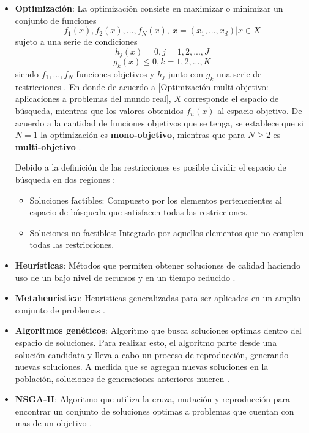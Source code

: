\documentclass[11pt,letterpaper]{article}
\begin{document}
\begin{itemize}
\item \textbf{Optimización}: La optimización consiste en maximizar o minimizar un conjunto de funciones
$$f_1(x),f_2(x), ..., f_N(x),\ x=(x_1,...,x_d) | x \in X$$
sujeto a una serie de condiciones
$$h_j(x) = 0, j=1,2,...,J$$
$$g_k(x) \leq 0, k=1,2,...,K$$
siendo $f_1,...,f_N$ funciones objetivos y   $h_j$ junto con $g_k$ una serie de restricciones \cite{Yang2015}. En donde de acuerdo a [Optimización multi-objetivo: aplicaciones a problemas del mundo real], $X$ corresponde el espacio de búsqueda, mientras que los valores obtenidos $f_n(x)$ al espacio objetivo. De acuerdo a la cantidad de funciones objetivos que se tenga, se establece que si $N=1$ la optimización es \textbf{mono-objetivo}, mientras que para $N\geq 2$ es \textbf{multi-objetivo} \cite{Yang2015}.

Debido a la definición de las restricciones es posible dividir el espacio de búsqueda en dos regiones \cite{Lopez2013}:
\begin{itemize}
	\item Soluciones factibles: Compuesto por los elementos pertenecientes al espacio de búsqueda que satisfacen todas las restricciones.
	\item Soluciones no factibles: Integrado por aquellos elementos que no complen todas las restricciones.
\end{itemize}
\item \textbf{Heurísticas}: Métodos que permiten obtener soluciones de calidad haciendo uso de un bajo nivel de recursos y en un tiempo reducido \cite{Lopez2013}.
\item \textbf{Metaheuristica}: Heuristicas generalizadas para ser aplicadas en un amplio conjunto de problemas \cite{Lopez2013}.
\item \textbf{Algoritmos genéticos}: Algoritmo que busca soluciones optimas dentro del espacio de soluciones. Para realizar esto, el algoritmo parte desde una solución candidata y lleva a cabo un proceso de reproducción, generando nuevas soluciones. A medida que se agregan nuevas soluciones en la población, soluciones de generaciones anteriores mueren \cite{Heiss-Czedik1997}.

\item \textbf{NSGA-II}: Algoritmo que utiliza la cruza, mutación y reproducción para encontrar un conjunto de soluciones optimas a problemas que cuentan con mas de un objetivo \cite{Deb2002}. 


\end{itemize}
\end{document}
